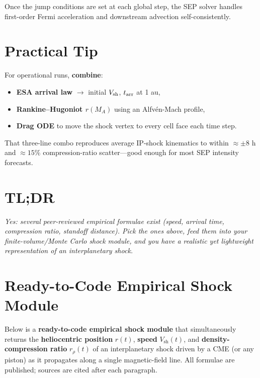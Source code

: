Once the jump conditions are set at each global step, the SEP solver handles first-order Fermi acceleration and downstream advection self-consistently.

\hrulefill

\section*{Practical Tip}

For operational runs, \textbf{combine}:
\begin{itemize}
    \item \textbf{ESA arrival law} $\rightarrow$ initial $V_{\rm sh}$, $t_{\rm arr}$ at 1 au,
    \item \textbf{Rankine–Hugoniot $r(M_A)$} using an Alfvén-Mach profile,
    \item \textbf{Drag ODE} to move the shock vertex to every cell face each time step.
\end{itemize}

That three-line combo reproduces average IP-shock kinematics to within $\approx \pm 8$ h and $\approx 15\%$ compression-ratio scatter—good enough for most SEP intensity forecasts.

\hrulefill

\section*{TL;DR}

\textit{Yes: several peer-reviewed empirical formulae exist (speed, arrival time, compression ratio, standoff distance). Pick the ones above, feed them into your finite-volume/Monte Carlo shock module, and you have a realistic yet lightweight representation of an interplanetary shock.}




\section*{Ready-to-Code Empirical Shock Module}

Below is a \textbf{ready-to-code empirical shock module} that simultaneously returns the \textbf{heliocentric position} $r(t)$, \textbf{speed} $V_{\text{sh}}(t)$, and \textbf{density-compression ratio} $r_{\rho}(t)$ of an interplanetary shock driven by a CME (or any piston) as it propagates along a single magnetic-field line. All formulae are published; sources are cited after each paragraph.

\hrulefill

